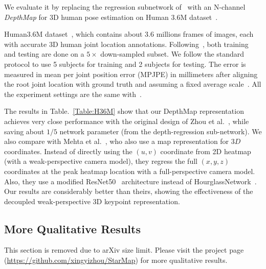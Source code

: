 \documentclass[runningheads]{llncs}
\begin{document}
We evaluate it by replacing the regression subnetwork of~\cite{Zhou_2017_ICCV} with an N-channel \emph{DepthMap} for 3D human pose estimation on Human 3.6M dataset~\cite{h36m_pami}. 

Human3.6M dataset~\cite{h36m_pami}, which contains about 3.6 millions frames of images, each with accurate 3D human joint location annotations. Following~\cite{Zhou_2017_ICCV,pavlakos2017coarse}, both training and testing are done on a $5 \times$ down-sampled subset. 
We follow the standard protocol to use 5 subjects for training and 2 subjects for testing. 
The error is measured in mean per joint position error (MPJPE) in millimeters after aligning the root joint location with ground truth and assuming a fixed average scale~\cite{Zhou_2017_ICCV,pavlakos2017coarse}.
All the experiment settings are the same with~\cite{Zhou_2017_ICCV}. 


The results in Table.~\ref{Table:H36M} show that our DepthMap representation achieves very close performance with the original design of Zhou et al.~\cite{Zhou_2017_ICCV}, 
while saving about $1/5$ network parameter (from the depth-regression sub-network).
We also compare with Mehta et al.~\cite{VNect_SIGGRAPH2017}, who also use a map representation for $3D$ coordinates. 
Instead of directly using the $(u, v)$ coordinate from 2D heatmap (with a weak-perspective camera model), they regress the full $(x, y, z)$ coordinates at the peak heatmap location with a full-perspective camera model. 
Also, they use a modified ResNet50~\cite{he2016deep} architecture instead of HourglassNetwork~\cite{newell2016stacked}. 
Our results are considerably better than theirs, showing the effectiveness of the decoupled weak-perspective 3D keypoint representation. 




\subsection{More Qualitative Results}
This section is removed due to arXiv size limit. Please visit the project page (\url{https://github.com/xingyizhou/StarMap}) for more qualitative results. 


 
\end{document}
